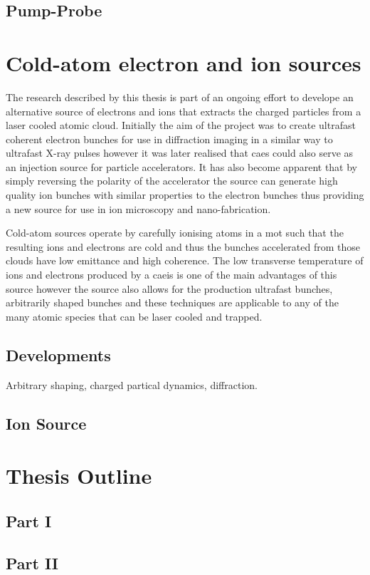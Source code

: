 \subsection{Pump-Probe}

\section{Cold-atom electron and ion sources}

The research described by this thesis is part of an ongoing effort to develope an alternative source of electrons and ions that extracts the charged particles from a laser cooled atomic cloud.
Initially the aim of the project was to create ultrafast coherent electron bunches for use in diffraction imaging in a similar way to ultrafast X-ray pulses however it was later realised that \gls{caes} could also serve as an injection source for particle accelerators.
It has also become apparent that by simply reversing the polarity of the accelerator the source can generate high quality ion bunches with similar properties to the electron bunches thus providing a new source for use in ion microscopy and nano-fabrication.

Cold-atom sources operate by carefully ionising atoms in a \gls{mot} such that the resulting ions and electrons are cold and thus the bunches accelerated from those clouds have low emittance and high coherence.
The low transverse temperature of ions and electrons produced by a \gls{caeis} is one of the main advantages of this source however the source also allows for the production ultrafast bunches, arbitrarily shaped bunches and these techniques are applicable to any of the many atomic species that can be laser cooled and trapped.

\subsection{Developments}

Arbitrary shaping, charged partical dynamics, diffraction.
\subsection{Ion Source}

\section{Thesis Outline}

\subsection{Part I}

\subsection{Part II}
